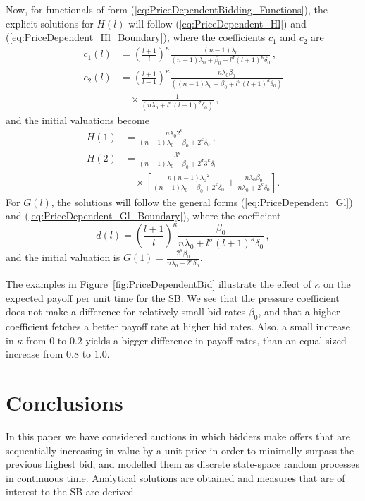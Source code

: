 \documentclass{article}
\begin{document}
Now, for functionals of form
(\ref{eq:PriceDependentBidding_Functions}), the explicit solutions
for $H(l)$ will follow (\ref{eq:PriceDependent_Hl}) and
(\ref{eq:PriceDependent_Hl_Boundary}), where the coefficients
$c_1$ and $c_2$ are
\begin{align}
c_1(l) &=
\left(\frac{l+1}{l}\right)^\kappa \frac{(n-1)\lambda_0} {(n-1)\lambda_0 + \beta_0 + l^\sigma(l+1)^\kappa\delta_0}   \,,\\
c_2(l) &= \left(\frac{l+1}{l-1}\right)^\kappa
\frac{n\lambda_0\beta_0}{\left((n-1)\lambda_0+\beta_0+l^\sigma(l+1)^\kappa
\delta_0 \right) } \nonumber \\
&\quad \times \frac{1}{\left(n\lambda_0 + l^\kappa (l-1)^\sigma
\delta_0 \right)}  \,,\nonumber
\end{align}
and the initial valuations become
\begin{align}
H(1) &=
\frac{n\lambda_0 2^\kappa}{(n-1)\lambda_0+\beta_0+2^\kappa\delta_0} \,,\\
H(2) &= \frac{3^\kappa}{(n-1)\lambda_0 + \beta_0 + 2^\sigma
3^\kappa \delta_0 }\nonumber\\
&\quad \times\left[\frac{n(n-1){\lambda_0}^2}{(n-1)\lambda_0 +
\beta_0 + 2^\kappa \delta_0}+ \frac{n\lambda_0 \beta_0}
{n\lambda_0 + 2^\kappa\delta_0 } \right] \nonumber.
\end{align}
For $G(l)$, the solutions will follow the general forms
(\ref{eq:PriceDependent_Gl}) and
(\ref{eq:PriceDependent_Gl_Boundary}), where the coefficient
\begin{equation}
d(l) = \left(\frac{l+1}{l}\right)^\kappa \frac{\beta_0}{n\lambda_0
+ l^\sigma(l+1)^\kappa \delta_0} \,,
\end{equation}
and the initial valuation is $G(1) = \frac{2^\kappa \beta_0}
{n\lambda_0 + 2^\kappa\delta_0 }$.


The examples in Figure~\ref{fig:PriceDependentBid} illustrate the
effect of $\kappa$ on the expected payoff per unit time for the
SB. We see that the pressure coefficient does not make a
difference for relatively small bid rates $\beta_0$, and that a
higher coefficient fetches a better payoff rate at higher bid
rates. Also, a small increase in $\kappa$ from $0$ to $0.2$ yields
a bigger difference in payoff rates, than an equal-sized increase
from $0.8$ to $1.0$.


\section{Conclusions} \label{Conclusions}
In this paper we have considered auctions in which bidders make
offers that are sequentially increasing in value by a unit price
in order to minimally surpass the previous highest bid, and
modelled them as discrete state-space random processes in
continuous time. Analytical solutions are obtained and measures
that are of interest to the SB are derived.
\end{document}
